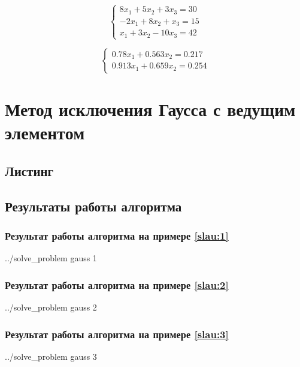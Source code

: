 \documentclass[a4paper]{article}
\begin{document}
\begin{equation}
    \begin{cases}
         8 x_1 + 5 x_2  + 3  x_3 = 30 \\
        -2 x_1 + 8 x_2  +    x_3 = 15 \\
           x_1 + 3 x_2  - 10 x_3 = 42
    \end{cases} \label{slau:4}
\end{equation}

\begin{equation}
    \begin{cases}
        0.78  x_1 + 0.563 x_2 = 0.217 \\
        0.913 x_1 + 0.659 x_2 = 0.254
    \end{cases} \label{slau:5}
\end{equation}

\break

\section{Метод исключения Гаусса с ведущим элементом}

\subsection{Листинг}


\break

\subsection{Результаты работы алгоритма}

\subsubsection{Результат работы алгоритма на примере \eqref{slau:1}}
\bash[stdout]
../solve_problem gauss 1
\END

\subsubsection{Результат работы алгоритма на примере \eqref{slau:2}}
\bash[stdout]
../solve_problem gauss 2
\END

\subsubsection{Результат работы алгоритма на примере \eqref{slau:3}}
\bash[stdout]
../solve_problem gauss 3
\END
\end{document}
